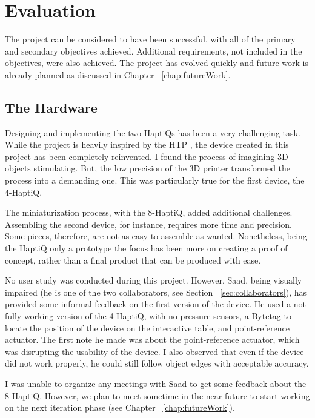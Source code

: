 \chapter{Evaluation}

The project can be considered to have been successful, with all of the primary and secondary objectives achieved. Additional requirements, not included in the objectives, were also achieved. The project has evolved quickly and future work is already planned as discussed in Chapter ~\ref{chap:futureWork}. 

\section{The Hardware}

Designing and implementing the two HaptiQs has been a very challenging task. While the project is heavily inspired by the HTP \cite{marquardt2009haptic}, the device created in this project has been completely reinvented. I found the process of imagining 3D objects stimulating. But, the low precision of the 3D printer transformed the process into a demanding one. This was particularly true for the first device, the 4-HaptiQ. 

The miniaturization process, with the 8-HaptiQ, added additional challenges. Assembling the second device, for instance, requires more time and precision. Some pieces, therefore, are not as easy to assemble as wanted. Nonetheless, being the HaptiQ only a prototype the focus has been more on creating a proof of concept, rather than a final product that can be produced with ease. 

No user study was conducted during this project. However, Saad, being visually impaired (he is one of the two collaborators, see Section ~\ref{sec:collaborators}), has provided some informal feedback on the first version of the device. He used a not-fully working version of the 4-HaptiQ, with no pressure sensors, a Bytetag to locate the position of the device on the interactive table, and point-reference actuator. The first note he made was about the point-reference actuator, which was disrupting the usability of the device. I also observed that even if the device did not work properly, he could still follow object edges with acceptable accuracy.  

I was unable to organize any meetings with Saad to get some feedback about the 8-HaptiQ. However, we plan to meet sometime in the near future to start working on the next iteration phase (see Chapter ~\ref{chap:futureWork}). 

